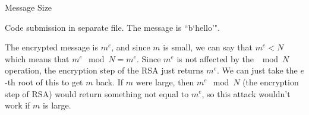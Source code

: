 \documentclass[11pt, nopagenumbers]{adamblan-hw}
\begin{document}
\begin{question}{\color{red} Message Size}

\begin{part}
Code submission in separate file. The message is ``b`hello'".
\end{part}

\begin{part}
The encrypted message is $m^e$, and since $m$ is small, we can say that $m^e < N$ which means that
$m^e \mod N = m^e$. Since $m^e$ is not affected by the $\mod N$ operation, the encryption step of the RSA
just returns $m^e$. We can just take the $e$-th root of this to get $m$ back. If $m$ were large, then $m^e \mod N$ 
(the encryption step of RSA) would return something not equal to $m^e$, so this attack wouldn't work if $m$ is large.
\end{part}
\end{question}
\end{document}
